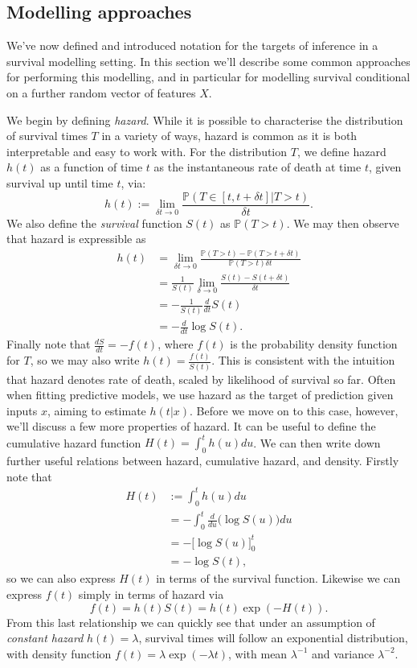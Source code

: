 \documentclass[../thesis.tex]{subfiles}
\begin{document}
\subsection{Modelling approaches}
We've now defined and introduced notation for the targets of inference in a survival modelling setting. In this section we'll describe some common approaches for performing this modelling, and in particular for modelling survival conditional on a further random vector of features $X$. 

We begin by defining \textit{hazard}. While it is possible to characterise the distribution of survival times $T$ in a variety of ways, hazard is common as it is both interpretable and easy to work with. For the distribution $T$, we define hazard $h(t)$ as a function of time $t$ as the instantaneous rate of death at time $t$, given survival up until time $t$, via:
\[
    h(t) := \lim_{\delta t \rightarrow 0} \frac{\mathbb{P}(T \in [t, t + \delta t] | T > t)}{\delta t}.
\]
We also define the \textit{survival} function $S(t)$ as $\mathbb{P}(T > t)$. We may then observe that hazard is expressible as 
\begin{align*}
    h(t) & = \lim_{\delta t \rightarrow 0} \frac{\mathbb{P}(T > t) - \mathbb{P}(T > t + \delta t)}{\mathbb{P}(T > t) \delta t} \\
    & = \frac{1}{S(t)} \lim_{\delta \rightarrow 0} \frac{S(t) - S(t + \delta t)}{\delta t}\\
    & = - \frac{1}{S(t)} \frac{d}{dt} S(t)\\
    & = - \frac{d}{dt} \log S(t). 
\end{align*}
Finally note that $\frac{dS}{dt} = - f(t)$, where $f(t)$ is the probability density function for $T$, so we may also write $h(t) = \frac{f(t)}{S(t)}$. This is consistent with the intuition that hazard denotes rate of death, scaled by likelihood of survival so far. Often when fitting predictive models, we use hazard as the target of prediction given inputs $x$, aiming to estimate $h(t|x)$. Before we move on to this case, however, we'll discuss a few more properties of hazard. It can be useful to define the cumulative hazard function $H(t) = \int_{0}^{t}h(u)du$. We can then write down further useful relations between hazard, cumulative hazard, and density. Firstly note that 
\begin{align*}
H(t) & := \int_{0}^{t}h(u)du \\
& = -\int_{0}^{t}\frac{d}{du} \big(\log S(u)\big) du  \\
& = - \big[\log S(u) \big]_{0}^{t} \\
& = -\log S(t),
\end{align*}
so we can also express $H(t)$ in terms of the survival function. Likewise we can express $f(t)$ simply in terms of hazard via
\[ f(t) = h(t)S(t) = h(t)\exp (-H(t)).\]
From this last relationship we can quickly see that under an assumption of \emph{constant hazard} $h(t)=\lambda$, survival times will follow an exponential distribution, with density function $f(t) = \lambda \exp(-\lambda t)$, with mean $\lambda^{-1}$ and variance $\lambda^{-2}$.
\end{document}
